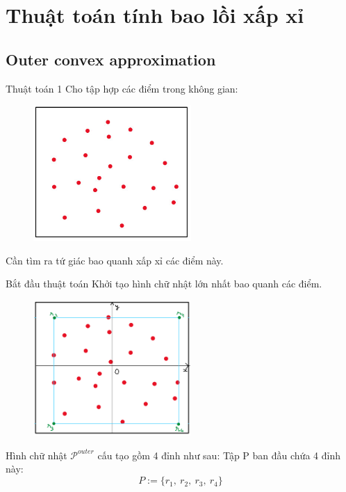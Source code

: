 \documentclass[11pt]{beamer}
\theoremstyle{definition}
\theoremstyle{plain}
\theoremstyle{plain}
\theoremstyle{remark}
\begin{document}
	
	\section{Thuật toán tính bao lồi xấp xỉ}
	\subsection{Outer convex approximation}
	\begin{frame}{Thuật toán 1}
		Cho tập hợp các điểm trong không gian:
			\begin{figure}
		\begin{center}
			\includegraphics[width=6cm]{./initial_sub_point.jpg}
		\end{center}
	\end{figure}
	Cần tìm ra tứ giác bao quanh xấp xỉ các điểm này.
	\end{frame}
	\begin{frame}{Bắt đầu thuật toán}
		Khởi tạo hình chữ nhật lớn nhất bao quanh các điểm.
		\begin{figure}
		
			\includegraphics[width=6cm]{khoi_tao_hcn_bao_quanh}
		\end{figure}
	\end{frame}
	\begin{frame}
		Hình chữ nhật $\mathcal{P}^{outer}$ cấu tạo gồm 4 đỉnh như sau:
		Tập P ban đầu chứa 4 đỉnh này:\\
		\begin{equation}\label{def_4r-2}
			P := \{r_1,\ r_2,\ r_3,\ r_4\}
		\end{equation}
	\end{frame}
\end{document}
